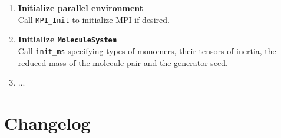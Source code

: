 \documentclass{article}
\begin{document}
\begin{enumerate}

\item \textbf{Initialize parallel environment} \\
Call \texttt{MPI\_Init} to initialize MPI if desired.

\item \textbf{Initialize \texttt{MoleculeSystem}} \\
Call \texttt{init\_ms} specifying types of monomers, their tensors of inertia, the reduced mass of the molecule pair and the generator seed.

\item ...

\end{enumerate}

\printbibliography[heading=bibintoc]



\section{Changelog}
\label{sec:changelog}
\end{document}
